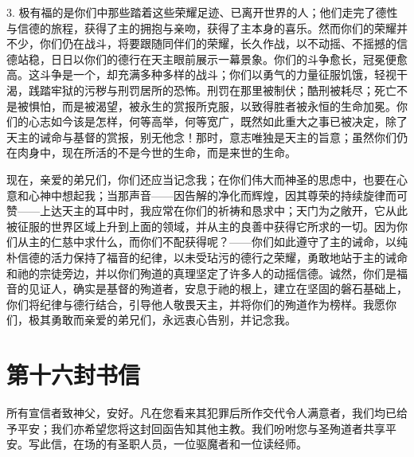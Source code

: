 3. 极有福的是你们中那些踏着这些荣耀足迹、已离开世界的人；他们走完了德性与信德的旅程，获得了主的拥抱与亲吻，获得了主本身的喜乐。然而你们的荣耀并不少，你们仍在战斗，将要跟随同伴们的荣耀，长久作战，以不动摇、不摇撼的信德站稳，日日以你们的德行在天主眼前展示一幕景象。你们的斗争愈长，冠冕便愈高。这斗争是一个，却充满多种多样的战斗；你们以勇气的力量征服饥饿，轻视干渴，践踏牢狱的污秽与刑罚居所的恐怖。刑罚在那里被制伏；酷刑被耗尽；死亡不是被惧怕，而是被渴望，被永生的赏报所克服，以致得胜者被永恒的生命加冕。你们的心志如今该是怎样，何等高举，何等宽广，既然如此重大之事已被决定，除了天主的诫命与基督的赏报，别无他念！那时，意志唯独是天主的旨意；虽然你们仍在肉身中，现在所活的不是今世的生命，而是来世的生命。\par

现在，亲爱的弟兄们，你们还应当记念我；在你们伟大而神圣的思虑中，也要在心意和心神中想起我；当那声音——因告解的净化而辉煌，因其尊荣的持续旋律而可赞——上达天主的耳中时，我应常在你们的祈祷和恳求中；天门为之敞开，它从此被征服的世界区域上升到上面的领域，并从主的良善中获得它所求的一切。因为你们从主的仁慈中求什么，而你们不配获得呢？——你们如此遵守了主的诫命，以纯朴信德的活力保持了福音的纪律，以未受玷污的德行之荣耀，勇敢地站于主的诫命和祂的宗徒旁边，并以你们殉道的真理坚定了许多人的动摇信德。诚然，你们是福音的见证人，确实是基督的殉道者，安息于祂的根上，建立在坚固的磐石基础上，你们将纪律与德行结合，引导他人敬畏天主，并将你们的殉道作为榜样。我愿你们，极其勇敢而亲爱的弟兄们，永远衷心告别，并记念我。\par



\section{第十六封书信}

\par

\par

所有宣信者致神父，安好。凡在您看来其犯罪后所作交代令人满意者，我们均已给予平安；我们亦希望您将这封回函告知其他主教。我们吩咐您与圣殉道者共享平安。写此信，在场的有圣职人员，一位驱魔者和一位读经师。\par

